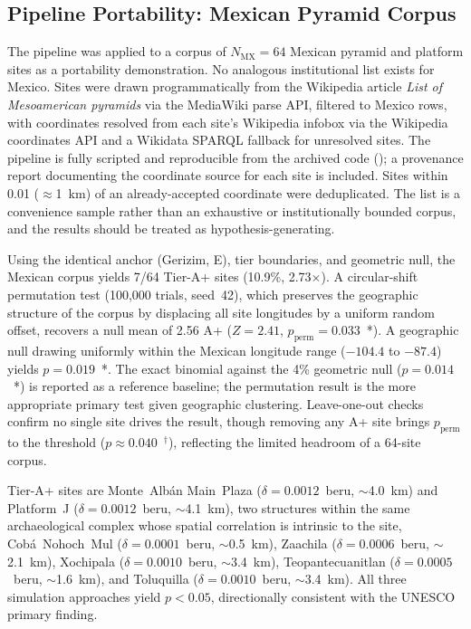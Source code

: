 \documentclass[HARVARD,twocolumn]{USG}
\begin{document}
\subsection{Pipeline Portability: Mexican Pyramid Corpus}
\label{sec:mexico}

The pipeline was applied to a corpus of $N_\mathrm{MX} = 64$ Mexican
pyramid and platform sites as a portability demonstration. No analogous
institutional list exists for Mexico. Sites were drawn programmatically
from the Wikipedia article \textit{List of Mesoamerican pyramids} via the
MediaWiki parse API, filtered to Mexico rows, with coordinates resolved
from each site's Wikipedia infobox via the Wikipedia coordinates API and
a Wikidata SPARQL fallback for unresolved sites. The pipeline is fully
scripted and reproducible from the archived code
(\citealt{tenenbaum2026audit}); a provenance report documenting the
coordinate source for each site is included. Sites within
0.01\textdegree{} ($\approx$1~km) of an already-accepted coordinate were
deduplicated. The list is a convenience sample rather than an exhaustive
or institutionally bounded corpus, and the results should be treated as
hypothesis-generating.

Using the identical anchor (Gerizim, \GerizimLon\textdegree{}E), tier
boundaries, and geometric null, the Mexican corpus yields 7/64 Tier-A+
sites (10.9\%, 2.73$\times$).
A circular-shift permutation test (100,000 trials, seed~42), which
preserves the geographic structure of the corpus by displacing all site
longitudes by a uniform random offset, recovers a null mean of
2.56 A+ ($Z = 2.41$, $p_\mathrm{perm} = 0.033$~*).
A geographic null drawing uniformly within the Mexican longitude range
($-104.4$\textdegree{} to $-87.4$\textdegree{}) yields $p = 0.019$~*.
The exact binomial against the 4\% geometric null ($p = 0.014$~*) is
reported as a reference baseline; the permutation result is the more
appropriate primary test given geographic clustering.
Leave-one-out checks confirm no single site drives the result, though
removing any A+ site brings $p_\mathrm{perm}$ to the threshold ($p \approx 0.040$~$^\dagger$),
reflecting the limited headroom of a 64-site corpus.

Tier-A+ sites are Monte~Alb\'{a}n Main~Plaza ($\delta = 0.0012$~beru,
$\sim$4.0~km) and Platform~J ($\delta = 0.0012$~beru, $\sim$4.1~km),
two structures within the same archaeological complex whose spatial
correlation is intrinsic to the site, Cob\'{a}~Nohoch~Mul
($\delta = 0.0001$~beru, $\sim$0.5~km), Zaachila ($\delta = 0.0006$~beru,
$\sim$2.1~km), Xochipala ($\delta = 0.0010$~beru, $\sim$3.4~km),
Teopantecuanitlan ($\delta = 0.0005$~beru, $\sim$1.6~km), and
Toluquilla ($\delta = 0.0010$~beru, $\sim$3.4~km).
All three simulation approaches yield $p < 0.05$, directionally
consistent with the UNESCO primary finding.
\end{document}
